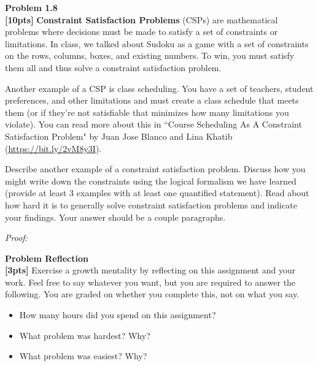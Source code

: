 \documentclass{article}
\newenvironment{problem}[2][Problem]
    { \begin{mdframed}[backgroundcolor=gray!20] \textbf{#1 #2} \\}
    {  \end{mdframed}}
\newenvironment{solution}
    {\textit{Proof:}}
    {}
\begin{document}
\begin{problem}{1.8}
\textbf{[10pts]} \textbf{Constraint Satisfaction Problems} (CSPs) are mathematical problems where decisions must be made to satisfy a set of constraints or limitations. In class, we talked about Sudoku as a game with a set of constraints on the rows, columns, boxes, and existing numbers. To win, you must satisfy them all and thus solve a constraint satisfaction problem. 

\vspace{1em}

Another example of a CSP is class scheduling. You have a set of teachers, student preferences, and other limitations and must create a class schedule that meets them (or if they're not satisfiable that minimizes how many limitations you violate). You can read more about this in ``Course Scheduling As A Constraint Satisfaction Problem" by Juan Jose Blanco and Lina Khatib (\url{https://bit.ly/2vM8y3I}). 

\vspace{1em}

Describe another example of a constraint satisfaction problem. Discuss how you might write down the constraints using the logical formalism we have learned (provide at least 3 examples with at least one quantified statement). Read about how hard it is to generally solve constraint satisfaction problems and indicate your findings. Your answer should be a couple paragraphs.
\end{problem}
\begin{solution}
\end{solution}
\vspace{4in} %

\begin{problem}{Reflection}
\textbf{[3pts]} Exercise a growth mentality by reflecting on this assignment and your work. Feel free to say whatever you want, but you are required to answer the following. You are graded on whether you complete this, not on what you say.
\begin{itemize}
\item How many hours did you spend on this assignment?
\item What problem was hardest? Why?
\item What problem was easiest? Why?
\end{itemize}
\end{problem}
\end{document}
